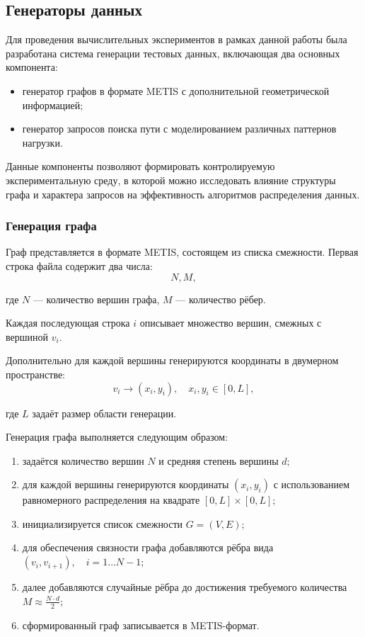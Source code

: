 \subsection{Генераторы данных}

Для проведения вычислительных экспериментов в рамках данной работы была разработана система генерации тестовых данных, включающая два основных компонента:
\begin{itemize}
    \item генератор графов в формате METIS с дополнительной геометрической информацией;
    \item генератор запросов поиска пути с моделированием различных паттернов нагрузки.
\end{itemize}

Данные компоненты позволяют формировать контролируемую экспериментальную среду, в которой можно исследовать влияние структуры графа и характера запросов на эффективность алгоритмов распределения данных.

\subsubsection{Генерация графа}

Граф представляется в формате METIS, состоящем из списка смежности. Первая строка файла содержит два числа:
\begin{equation*}
    N, M,
\end{equation*}

где $N$ --- количество вершин графа, $M$ --- количество рёбер.

Каждая последующая строка $i$ описывает множество вершин, смежных с вершиной $v_i$.

Дополнительно для каждой вершины генерируются координаты в двумерном пространстве:
\begin{equation*}
    v_i \rightarrow (x_i, y_i), \quad x_i, y_i \in [0, L],
\end{equation*}

где $L$ задаёт размер области генерации.

Генерация графа выполняется следующим образом:

\begin{enumerate}
    \item задаётся количество вершин $N$ и средняя степень вершины $d$;
    
    \item для каждой вершины генерируются координаты $(x_i, y_i)$ с использованием равномерного распределения на квадрате $[0, L] \times [0, L]$;

    \item инициализируется список смежности $G = (V, E)$;

    \item для обеспечения связности графа добавляются рёбра вида $(v_i, v_{i+1}), \quad i = 1 \dots N-1$;

    \item далее добавляются случайные рёбра до достижения требуемого количества $M \approx \frac{N \cdot d}{2}$;

    \item сформированный граф записывается в METIS-формат.
\end{enumerate}

